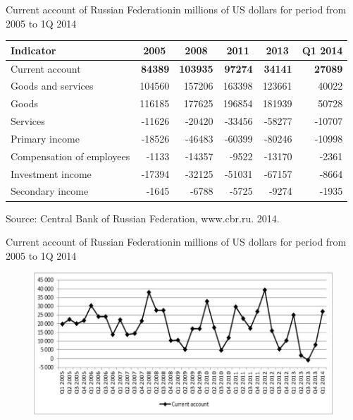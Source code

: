 \documentclass[international_finance_p1.tex]{subfiles}
\begin{document}
\begin{frame}[shrink=20]{Current account of Russian Federation}{in millions of US dollars for period from 2005 to 1Q 2014}
\begin{table}[htbp]
  \centering
  \begin{tabularx}{\linewidth}[b]{@{}>{\raggedright\arraybackslash}Xrrrrr@{}}
    \toprule
    Indicator & \multicolumn{1}{c}{2005} & \multicolumn{1}{c}{2008} & \multicolumn{1}{c}{2011} & \multicolumn{1}{c}{2013} & \multicolumn{1}{c}{Q1 2014} \\
    \midrule
    \Large{Current account} & \textbf{84389} & \textbf{103935} & \textbf{97274} & \textbf{34141} & \textbf{27089} \\
    \midrule
	\rowcolor{gray!20}    Goods and services & 104560 & 157206 & 163398 & 123661 & 40022 \\
    \small{	      Goods} & 116185 & 177625 & 196854 & 181939 & 50728 \\
	\small{	      Services} & -11626 & -20420 & -33456 & -58277 & -10707 \\
	\rowcolor{gray!20}    Primary income & -18526 & -46483 & -60399 & -80246 & -10998 \\
    \small{	      Compensation of employees} & -1133 & -14357 & -9522 & -13170 & -2361 \\
	\small{	      Investment income} & -17394 & -32125 & -51031 & -67157 & -8664 \\
	\rowcolor{gray!20}    Secondary income & -1645 & -6788 & -5725 & -9274 & -1935 \\
    \bottomrule
    \end{tabularx}%
  \label{tab:addlabel}%
\end{table}%

\raggedright
Source: Central Bank of Russian Federation, www.cbr.ru. 2014.  \end{frame}

\begin{frame}[shrink=20]{Current account of Russian Federation}{in millions of US dollars for period from 2005 to 1Q 2014}
\begin{center}
\begin{figure}
\includegraphics[scale=0.60]{img/curaccount}
\end{figure}
\end{center}
\end{frame}
\end{document}
